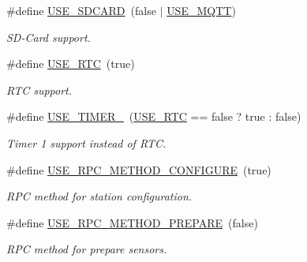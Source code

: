\begin{DoxyCompactItemize}
\#define \hyperlink{rmap-config_8h_ad1b880b20b32f399da65d86c5dd50cee}{U\+S\+E\+\_\+\+S\+D\+C\+A\+RD}~(false $\vert$ \hyperlink{rmap-config_8h_a3c6bee2b593ec16dc4cf77ffcfd4cea8}{U\+S\+E\+\_\+\+M\+Q\+TT})
\begin{DoxyCompactList}\small\item\em S\+D-\/\+Card support. \end{DoxyCompactList}\item 
\mbox{\label{rmap-config_8h_afacc6ecc4901a729fac01bbea03deb51}} 
\#define \hyperlink{rmap-config_8h_afacc6ecc4901a729fac01bbea03deb51}{U\+S\+E\+\_\+\+R\+TC}~(true)
\begin{DoxyCompactList}\small\item\em R\+TC support. \end{DoxyCompactList}\item 
\mbox{\label{rmap-config_8h_a8051c2a569a9f9c488af89bce47ec306}} 
\#define \hyperlink{rmap-config_8h_a8051c2a569a9f9c488af89bce47ec306}{U\+S\+E\+\_\+\+T\+I\+M\+E\+R\+\_}~(\hyperlink{rmap-config_8h_afacc6ecc4901a729fac01bbea03deb51}{U\+S\+E\+\_\+\+R\+TC} == false ? true \+: false)
\begin{DoxyCompactList}\small\item\em Timer 1 support instead of R\+TC. \end{DoxyCompactList}\item 
\mbox{\label{rmap-config_8h_a094380189345c7bf2de7fa50ef36a293}} 
\#define \hyperlink{rmap-config_8h_a094380189345c7bf2de7fa50ef36a293}{U\+S\+E\+\_\+\+R\+P\+C\+\_\+\+M\+E\+T\+H\+O\+D\+\_\+\+C\+O\+N\+F\+I\+G\+U\+RE}~(true)
\begin{DoxyCompactList}\small\item\em R\+PC method for station configuration. \end{DoxyCompactList}\item 
\mbox{\label{rmap-config_8h_addbf65bcf0ab013ba745395749b2e994}} 
\#define \hyperlink{rmap-config_8h_addbf65bcf0ab013ba745395749b2e994}{U\+S\+E\+\_\+\+R\+P\+C\+\_\+\+M\+E\+T\+H\+O\+D\+\_\+\+P\+R\+E\+P\+A\+RE}~(false)
\begin{DoxyCompactList}\small\item\em R\+PC method for prepare sensors. \end{DoxyCompactList}\item 

\end{DoxyCompactItemize}
